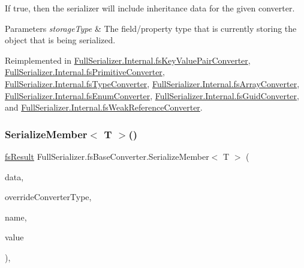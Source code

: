 If true, then the serializer will include inheritance data for the given converter. 


\begin{DoxyParams}{Parameters}
{\em storage\+Type} & The field/property type that is currently storing the object that is being serialized.\\
\hline
\end{DoxyParams}


Reimplemented in \hyperlink{class_full_serializer_1_1_internal_1_1fs_key_value_pair_converter_af20b5573e313464e13c17735746a2267}{Full\+Serializer.\+Internal.\+fs\+Key\+Value\+Pair\+Converter}, \hyperlink{class_full_serializer_1_1_internal_1_1fs_primitive_converter_a96bfa5776105d8d9fffb1fd01c53af2e}{Full\+Serializer.\+Internal.\+fs\+Primitive\+Converter}, \hyperlink{class_full_serializer_1_1_internal_1_1fs_type_converter_a3f4750a4e8a6a6ae582c73cf5d8142e5}{Full\+Serializer.\+Internal.\+fs\+Type\+Converter}, \hyperlink{class_full_serializer_1_1_internal_1_1fs_array_converter_a0c8625b10aee6ed789981e1f14c09ca1}{Full\+Serializer.\+Internal.\+fs\+Array\+Converter}, \hyperlink{class_full_serializer_1_1_internal_1_1fs_enum_converter_a4af727f1cb13c61c7e5f57bb6c3e682b}{Full\+Serializer.\+Internal.\+fs\+Enum\+Converter}, \hyperlink{class_full_serializer_1_1_internal_1_1fs_guid_converter_a4556062bfaec5d51b7c1120bf1388a4c}{Full\+Serializer.\+Internal.\+fs\+Guid\+Converter}, and \hyperlink{class_full_serializer_1_1_internal_1_1fs_weak_reference_converter_a4f8dd86c002f7a3e6b25a1b16d791c60}{Full\+Serializer.\+Internal.\+fs\+Weak\+Reference\+Converter}.

\mbox{\label{class_full_serializer_1_1fs_base_converter_a024019330f070b9fb3d49a5213c9aae8}} 
\subsubsection{\texorpdfstring{Serialize\+Member$<$ T $>$()}{SerializeMember< T >()}}
{\footnotesize\ttfamily \hyperlink{struct_full_serializer_1_1fs_result}{fs\+Result} Full\+Serializer.\+fs\+Base\+Converter.\+Serialize\+Member$<$ T $>$ (\begin{DoxyParamCaption}\item[{Dictionary$<$ string, \hyperlink{class_full_serializer_1_1fs_data}{fs\+Data} $>$}]{data,  }\item[{Type}]{override\+Converter\+Type,  }\item[{string}]{name,  }\item[{T}]{value }\end{DoxyParamCaption})\hspace{0.3cm}{\ttfamily [inline]}, {\ttfamily [protected]}}



